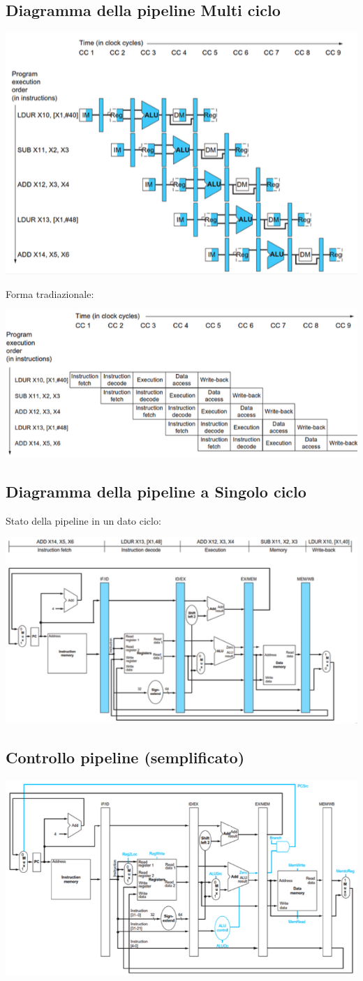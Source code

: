 \documentclass[12pt,a4paper]{article}
\begin{document}
\subsection{Diagramma della pipeline Multi ciclo}
\begin{center}
\includegraphics[width=0.6\columnwidth]{img/pipeline_multiciclo.png}
\end{center}
Forma tradiazionale:
\begin{center}
\includegraphics[width=0.6\columnwidth]{img/pipeline_multiciclo_trad.png}
\end{center}

\subsection{Diagramma della pipeline a Singolo ciclo}
Stato della pipeline in un dato ciclo:
\begin{center}
\includegraphics[width=0.6\columnwidth]{img/pipeline_singolociclo.png}
\end{center}

\subsection{Controllo pipeline (semplificato)}
\begin{center}
\includegraphics[width=0.6\columnwidth]{img/pipeline_control_simp.png}
\end{center}
\end{document}
